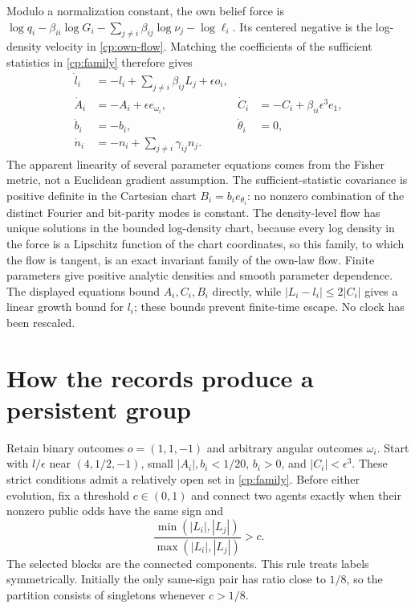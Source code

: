 Modulo a normalization constant, the own belief force is $\log q_i-\beta_{ii}\log G_i-\sum_{j\ne i}\beta_{ij}\log\nu_j-\log\ell_i$. Its centered negative is the log-density velocity in \cref{cp:own-flow}. Matching the coefficients of the sufficient statistics in \cref{cp:family} therefore gives
\begin{equation}
 \begin{aligned}
 \dot l_i&=-l_i+\sum_{j\ne i}\beta_{ij}L_j+\epsilon o_i,\\
 \dot A_i&=-A_i+\epsilon e_{\omega_i},&
 \dot C_i&=-C_i+\beta_{ii}\epsilon^3e_1,\\
 \dot b_i&=-b_i,&\dot\theta_i&=0,\\
 \dot n_i&=-n_i+\sum_{j\ne i}\gamma_{ij}n_j.
 \end{aligned}
 \label{cp:parameters}
\end{equation}
The apparent linearity of several parameter equations comes from the Fisher metric, not a Euclidean gradient assumption. The sufficient-statistic covariance is positive definite in the Cartesian chart $B_i=b_ie_{\theta_i}$: no nonzero combination of the distinct Fourier and bit-parity modes is constant. The density-level flow has unique solutions in the bounded log-density chart, because every log density in the force is a Lipschitz function of the chart coordinates, so this family, to which the flow is tangent, is an exact invariant family of the own-law flow. Finite parameters give positive analytic densities and smooth parameter dependence. The displayed equations bound $A_i,C_i,B_i$ directly, while $|L_i-l_i|\leq2|C_i|$ gives a linear growth bound for $l_i$; these bounds prevent finite-time escape. No clock has been rescaled.

\section{How the records produce a persistent group}

Retain binary outcomes $o=(1,1,-1)$ and arbitrary angular outcomes $\omega_i$. Start with $l/\epsilon$ near $(4,1/2,-1)$, small $|A_i|,b_i<1/20$, $b_i>0$, and $|C_i|<\epsilon^3$. These strict conditions admit a relatively open set in \cref{cp:family}. Before either evolution, fix a threshold $c\in(0,1)$ and connect two agents exactly when their nonzero public odds have the same sign and
\begin{equation}
 \frac{\min(|L_i|,|L_j|)}{\max(|L_i|,|L_j|)}>c.
 \label{cp:selector}
\end{equation}
The selected blocks are the connected components. This rule treats labels symmetrically. Initially the only same-sign pair has ratio close to $1/8$, so the partition consists of singletons whenever $c>1/8$.

